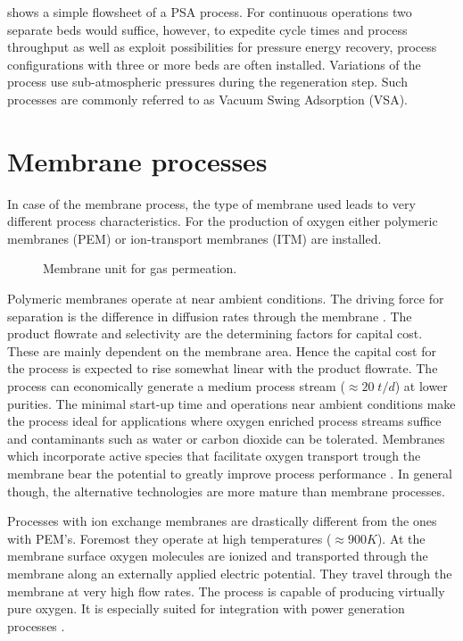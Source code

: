      shows a simple flowsheet of a PSA process. For continuous operations two separate beds would
    suffice, however, to expedite cycle times and process throughput as well as exploit possibilities for pressure
    energy recovery, process configurations with three or more beds are often installed. Variations of the process
    use sub-atmospheric pressures during the regeneration step. Such processes are commonly referred to as Vacuum Swing
    Adsorption (VSA).

    \section{Membrane processes}
    \label{sec:membrane}
    In case of the membrane process, the type of membrane used leads to very different process characteristics. For the
    production of oxygen either polymeric membranes (PEM) or ion-transport membranes (ITM) are installed.

     \begin{figure}
    	\center
    	
	    \caption{Membrane unit for gas permeation.}
    	\label{fig:gas_permeation}
    \end{figure}

    Polymeric membranes operate at near ambient conditions. The driving force for separation is the difference
    in diffusion rates through the membrane \cite{Melin.2007}. The product flowrate and selectivity are the
    determining factors for capital cost. These are mainly dependent on the membrane area. Hence
    the capital cost for the process is expected to rise somewhat linear with the product flowrate.
    The process can economically generate a medium process stream ($\approx 20 \; t/d$) at lower purities.
    The minimal start-up time and operations near ambient conditions make the process ideal for
    applications where oxygen enriched process streams suffice and contaminants such as water or carbon
    dioxide can be tolerated. Membranes which incorporate active species that facilitate oxygen transport
    trough the membrane bear the potential to greatly improve process performance \cite{Kammermeyer.1976}.
    In general though, the alternative technologies are more mature than membrane processes.

    Processes with ion exchange membranes are drastically different from the ones with PEM's. Foremost they
    operate at high temperatures ($\approx 900 K$). At the membrane surface oxygen molecules are ionized
    and transported through the membrane along an externally applied electric potential. They travel
    through the membrane at very high flow rates. The process is capable of producing virtually pure
    oxygen. It is especially suited for integration with power generation processes \cite{Smith.2001}.

